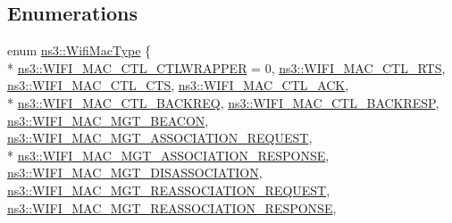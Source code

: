 \subsection*{Enumerations}
\begin{DoxyCompactItemize}
\item 
enum \hyperlink{namespacens3_a9318472db39b35b2092de5c721e6ab0a}{ns3\+::\+Wifi\+Mac\+Type} \{ \\*
\hyperlink{namespacens3_a9318472db39b35b2092de5c721e6ab0aa5c1d699609af2aadbf1d3cb727aa894e}{ns3\+::\+W\+I\+F\+I\+\_\+\+M\+A\+C\+\_\+\+C\+T\+L\+\_\+\+C\+T\+L\+W\+R\+A\+P\+P\+ER} = 0, 
\hyperlink{namespacens3_a9318472db39b35b2092de5c721e6ab0aa43ed89d21958665f84711a6b6d0fb75f}{ns3\+::\+W\+I\+F\+I\+\_\+\+M\+A\+C\+\_\+\+C\+T\+L\+\_\+\+R\+TS}, 
\hyperlink{namespacens3_a9318472db39b35b2092de5c721e6ab0aa529299bd6c8159e0dc3f56acb749eff4}{ns3\+::\+W\+I\+F\+I\+\_\+\+M\+A\+C\+\_\+\+C\+T\+L\+\_\+\+C\+TS}, 
\hyperlink{namespacens3_a9318472db39b35b2092de5c721e6ab0aa94b81d2741a3a2ab30de5df6e04fc850}{ns3\+::\+W\+I\+F\+I\+\_\+\+M\+A\+C\+\_\+\+C\+T\+L\+\_\+\+A\+CK}, 
\\*
\hyperlink{namespacens3_a9318472db39b35b2092de5c721e6ab0aa1b3c29e4b46847a71ad8f3b45c747456}{ns3\+::\+W\+I\+F\+I\+\_\+\+M\+A\+C\+\_\+\+C\+T\+L\+\_\+\+B\+A\+C\+K\+R\+EQ}, 
\hyperlink{namespacens3_a9318472db39b35b2092de5c721e6ab0aaabd6e2bca4aa9279211a5e7d0c5c5afa}{ns3\+::\+W\+I\+F\+I\+\_\+\+M\+A\+C\+\_\+\+C\+T\+L\+\_\+\+B\+A\+C\+K\+R\+E\+SP}, 
\hyperlink{namespacens3_a9318472db39b35b2092de5c721e6ab0aa6bc0d1acc5d5b35462a68b8ad89870ab}{ns3\+::\+W\+I\+F\+I\+\_\+\+M\+A\+C\+\_\+\+M\+G\+T\+\_\+\+B\+E\+A\+C\+ON}, 
\hyperlink{namespacens3_a9318472db39b35b2092de5c721e6ab0aaa492647f7cc9cf143b2c05cd9b943f8d}{ns3\+::\+W\+I\+F\+I\+\_\+\+M\+A\+C\+\_\+\+M\+G\+T\+\_\+\+A\+S\+S\+O\+C\+I\+A\+T\+I\+O\+N\+\_\+\+R\+E\+Q\+U\+E\+ST}, 
\\*
\hyperlink{namespacens3_a9318472db39b35b2092de5c721e6ab0aa82d523f7f07c3247cd5bbc8541f14160}{ns3\+::\+W\+I\+F\+I\+\_\+\+M\+A\+C\+\_\+\+M\+G\+T\+\_\+\+A\+S\+S\+O\+C\+I\+A\+T\+I\+O\+N\+\_\+\+R\+E\+S\+P\+O\+N\+SE}, 
\hyperlink{namespacens3_a9318472db39b35b2092de5c721e6ab0aa9583e9bca90d8b192b481160bc378ce4}{ns3\+::\+W\+I\+F\+I\+\_\+\+M\+A\+C\+\_\+\+M\+G\+T\+\_\+\+D\+I\+S\+A\+S\+S\+O\+C\+I\+A\+T\+I\+ON}, 
\hyperlink{namespacens3_a9318472db39b35b2092de5c721e6ab0aaa860608499e0aaf37a677fb2a84dd70d}{ns3\+::\+W\+I\+F\+I\+\_\+\+M\+A\+C\+\_\+\+M\+G\+T\+\_\+\+R\+E\+A\+S\+S\+O\+C\+I\+A\+T\+I\+O\+N\+\_\+\+R\+E\+Q\+U\+E\+ST}, 
\hyperlink{namespacens3_a9318472db39b35b2092de5c721e6ab0aaf9e403598652840f9b0ae2e9599381fd}{ns3\+::\+W\+I\+F\+I\+\_\+\+M\+A\+C\+\_\+\+M\+G\+T\+\_\+\+R\+E\+A\+S\+S\+O\+C\+I\+A\+T\+I\+O\+N\+\_\+\+R\+E\+S\+P\+O\+N\+SE}, 

\end{DoxyCompactItemize}
